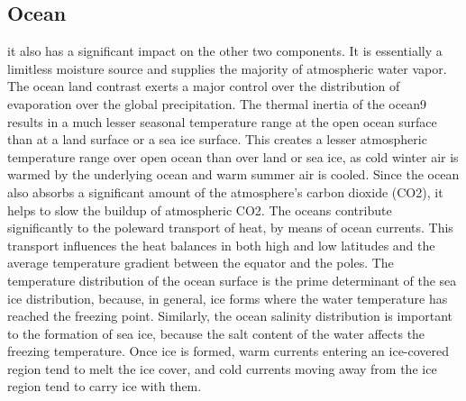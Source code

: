 \subsection{Ocean}\label{subsec:ocean-interconnections}
it also has a significant impact on the other two components. It is essentially a limitless moisture source and supplies the majority of atmospheric water vapor. The ocean land contrast exerts a major control over the distribution of evaporation over the global precipitation. The thermal inertia of the ocean9 results in a much lesser seasonal temperature range at the open ocean surface than at a land surface or a sea ice surface.
This creates a lesser atmospheric temperature range over open ocean than over land or sea ice, as cold winter air is warmed by the underlying ocean and warm summer air is cooled. Since the ocean also absorbs a significant amount of the atmosphere’s carbon dioxide (CO2), it helps to slow the buildup of atmospheric CO2.
The oceans contribute significantly to the poleward transport of heat, by means of ocean currents. This transport influences the heat balances in both high and low latitudes and the average temperature gradient between the equator and the poles. The temperature distribution of the ocean surface is the prime determinant of the sea ice distribution, because, in general, ice forms where the water temperature has reached the freezing point. Similarly, the ocean salinity distribution is important to the formation of sea ice, because the salt content of the water affects the freezing temperature. Once ice is formed, warm currents entering an ice-covered region tend to melt the ice cover, and cold currents moving away from the ice region tend to carry ice with them.

